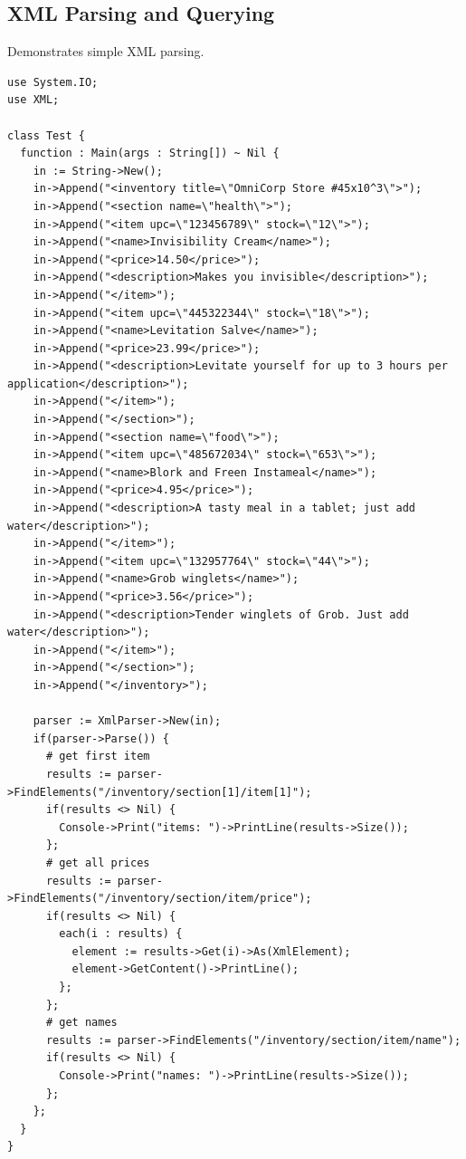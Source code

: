 \documentclass[11pt]{article}
\begin{document}
\subsection{XML Parsing and Querying}
Demonstrates simple XML parsing.
\begingroup
\fontsize{8pt}{9pt}\selectfont
\begin{verbatim}
use System.IO;
use XML;

class Test {
  function : Main(args : String[]) ~ Nil {
    in := String->New();
    in->Append("<inventory title=\"OmniCorp Store #45x10^3\">");
    in->Append("<section name=\"health\">");
    in->Append("<item upc=\"123456789\" stock=\"12\">");
    in->Append("<name>Invisibility Cream</name>");
    in->Append("<price>14.50</price>");
    in->Append("<description>Makes you invisible</description>");
    in->Append("</item>");
    in->Append("<item upc=\"445322344\" stock=\"18\">");
    in->Append("<name>Levitation Salve</name>");
    in->Append("<price>23.99</price>");
    in->Append("<description>Levitate yourself for up to 3 hours per application</description>");
    in->Append("</item>");
    in->Append("</section>");
    in->Append("<section name=\"food\">");
    in->Append("<item upc=\"485672034\" stock=\"653\">");
    in->Append("<name>Blork and Freen Instameal</name>");
    in->Append("<price>4.95</price>");
    in->Append("<description>A tasty meal in a tablet; just add water</description>");
    in->Append("</item>");
    in->Append("<item upc=\"132957764\" stock=\"44\">");
    in->Append("<name>Grob winglets</name>");
    in->Append("<price>3.56</price>");
    in->Append("<description>Tender winglets of Grob. Just add water</description>");
    in->Append("</item>");
    in->Append("</section>");
    in->Append("</inventory>");
  
    parser := XmlParser->New(in);
    if(parser->Parse()) {
      # get first item
      results := parser->FindElements("/inventory/section[1]/item[1]");
      if(results <> Nil) {
        Console->Print("items: ")->PrintLine(results->Size());
      };
      # get all prices
      results := parser->FindElements("/inventory/section/item/price");
      if(results <> Nil) {
        each(i : results) {          
          element := results->Get(i)->As(XmlElement);
          element->GetContent()->PrintLine();
        };
      };
      # get names
      results := parser->FindElements("/inventory/section/item/name");
      if(results <> Nil) {
        Console->Print("names: ")->PrintLine(results->Size());
      };
    };
  }
}
\end{verbatim}
\endgroup
\end{document}
